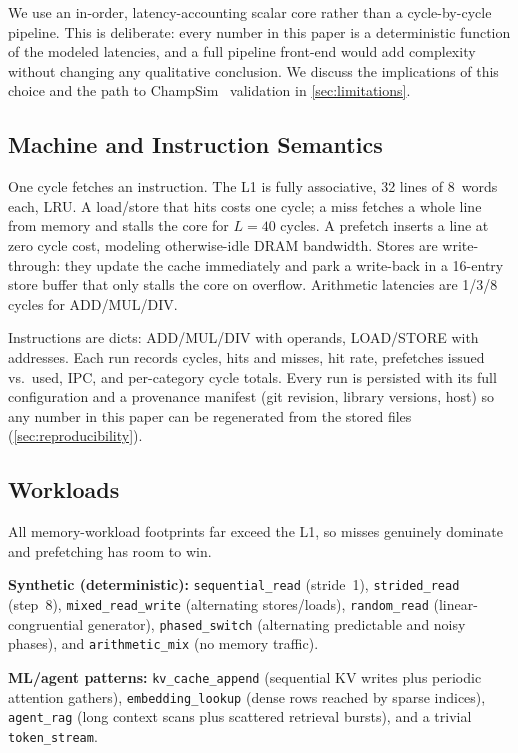 \documentclass[conference]{IEEEtran}
\begin{document}
We use an in-order, latency-accounting scalar core rather than a cycle-by-cycle
pipeline. This is deliberate: every number in this paper is a deterministic function
of the modeled latencies, and a full pipeline front-end would add complexity without
changing any qualitative conclusion. We discuss the implications of this choice and
the path to ChampSim~\cite{champsim} validation in \cref{sec:limitations}.

\subsection{Machine and Instruction Semantics}

One cycle fetches an instruction. The L1 is fully associative, 32 lines of 8~words
each, LRU. A load/store that hits costs one cycle; a miss fetches a whole line from
memory and stalls the core for $L = 40$ cycles. A prefetch inserts a line at zero
cycle cost, modeling otherwise-idle DRAM bandwidth. Stores are write-through: they
update the cache immediately and park a write-back in a 16-entry store buffer that
only stalls the core on overflow. Arithmetic latencies are 1/3/8 cycles for
ADD/MUL/DIV.

Instructions are dicts: ADD/MUL/DIV with operands, LOAD/STORE with addresses. Each
run records cycles, hits and misses, hit rate, prefetches issued vs.\ used, IPC, and
per-category cycle totals. Every run is persisted with its full configuration and a
provenance manifest (git revision, library versions, host) so any number in this
paper can be regenerated from the stored files (\cref{sec:reproducibility}).

\subsection{Workloads}
\label{sec:workloads}

All memory-workload footprints far exceed the L1, so misses genuinely dominate and
prefetching has room to win.

\textbf{Synthetic (deterministic):}
\texttt{sequential\_read} (stride~1),
\texttt{strided\_read} (step~8),
\texttt{mixed\_read\_write} (alternating stores/loads),
\texttt{random\_read} (linear-congruential generator),
\texttt{phased\_switch} (alternating predictable and noisy phases), and
\texttt{arithmetic\_mix} (no memory traffic).

\textbf{ML/agent patterns:}
\texttt{kv\_cache\_append} (sequential KV writes plus periodic attention gathers),
\texttt{embedding\_lookup} (dense rows reached by sparse indices),
\texttt{agent\_rag} (long context scans plus scattered retrieval bursts), and a
trivial \texttt{token\_stream}.
\end{document}
